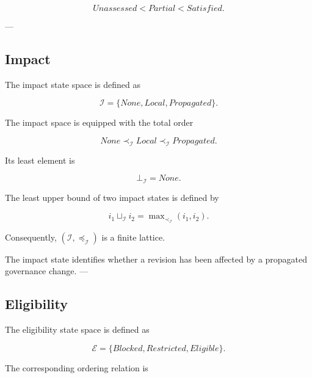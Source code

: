 \documentclass[10pt]{article}
\begin{document}
\begin{equation}
	Unassessed
	<
	Partial
	<
	Satisfied.
	\label{eq:assurance_order}
\end{equation}

---

\subsection{Impact}

The impact state space is defined as

\begin{equation}
	\mathcal{I}=
	\{
	None,
	Local,
	Propagated
	\}.
	\label{eq:impact_space}
\end{equation}

The impact space is equipped with the total order

\begin{equation}
	None
	\prec_{\mathcal I}
	Local
	\prec_{\mathcal I}
	Propagated.
	\label{eq:impact_order}
\end{equation}

Its least element is

\begin{equation}
	\bot_{\mathcal{I}}
	=
	None.
	\label{eq:impact_bottom}
\end{equation}

The least upper bound of two impact states is defined by

\begin{equation}
	i_1
	\sqcup_{\mathcal{I}}
	i_2
	=
	\max\nolimits_{\prec_{\mathcal{I}}}
	\left(i_1,i_2\right).
	\label{eq:impact_join}
\end{equation}

Consequently,
$\left(\mathcal{I},\preceq_{\mathcal{I}}\right)$ is a finite lattice.

The impact state identifies whether a revision has been affected by a propagated governance change.
---

\subsection{Eligibility}

The eligibility state space is defined as

\begin{equation}
	\mathcal{E}=
	\{
	Blocked,
	Restricted,
	Eligible
	\}.
	\label{eq:eligibility_space}
\end{equation}

The corresponding ordering relation is
\end{document}

